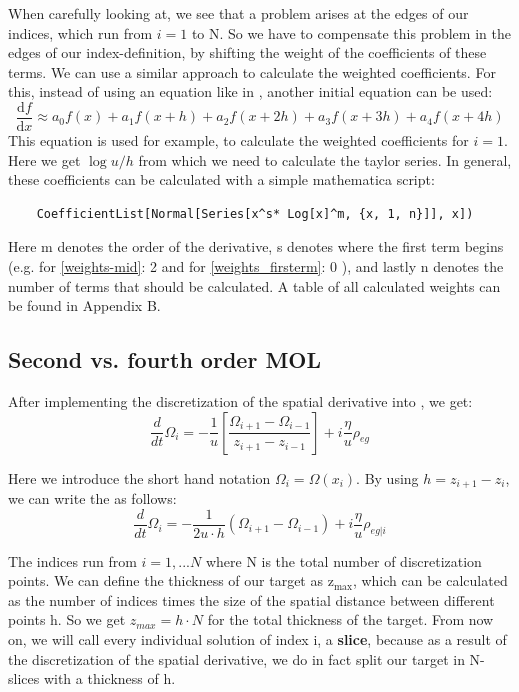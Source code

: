 When carefully looking at, we see that a problem arises at the edges of our indices, which run from $i =1$ to N. So we have to compensate this problem in the edges of our index-definition, by shifting the weight of the coefficients of these terms. We can use a similar approach to calculate the weighted coefficients. For this, instead of using an equation like in , another initial equation can be used:
\begin{equation} \label{weights_firsterm}
    \frac{\mathrm{d}f}{\mathrm{d}x} \approx a_0 f(x) + a_1 f(x+h) + a_2 f(x+2h) + a_3 f(x+3h) + a_4 f(x+4h)  
\end{equation}
This equation is used for example, to calculate the weighted coefficients for $i =1$. Here we get $\log u /h$ from which we need to calculate the taylor series. In general, these coefficients can be calculated with a simple mathematica script:
\begin{verbatim}
    CoefficientList[Normal[Series[x^s* Log[x]^m, {x, 1, n}]], x])
\end{verbatim}
Here m denotes the order of the derivative, s denotes where the first term begins (e.g. for \cref{weights-mid}: 2 and for \cref{weights_firsterm}: 0 ), and lastly n denotes the number of terms that should be calculated. A table of all calculated weights can be found in Appendix B.

\subsection{Second vs. fourth order MOL}
After implementing the discretization of the spatial derivative into , we get:
\begin{equation}
        \frac{d}{dt} \Omega_i = -\frac{1}{u} \left[ \frac{\Omega_{i+1} - \Omega_{i-1}}{z_{i+1} - z_{i-1}}\right] + i \frac{\eta}{u} \rho_{eg} \label{discre_first}
\end{equation}

Here we introduce the short hand notation $\Omega_i = \Omega(x_i) $. By using $h= z_{i+1} - z_i$, we can write the  as follows:
\begin{equation} \label{second_order}
        \frac{d}{dt} \Omega_i = -\frac{1}{2u  \cdot h}  (\Omega_{i+1} - \Omega_{i-1})+ i \frac{\eta}{u} \rho_{eg|i}
\end{equation}

The indices run from $i=1,...N$ where N is the total number of discretization points. We can define the thickness of our target as $\mathrm{z_\mathrm{max}}$, which can be calculated as the number of indices times the size of the spatial distance between different points h. So we get $z_{max} = h \cdot N$ for the total thickness of the target. From now on, we will call every individual solution of index i, a \textbf{slice}, because as a result of the discretization of the spatial derivative, we do in fact split our target in N-slices with a thickness of h.\\

